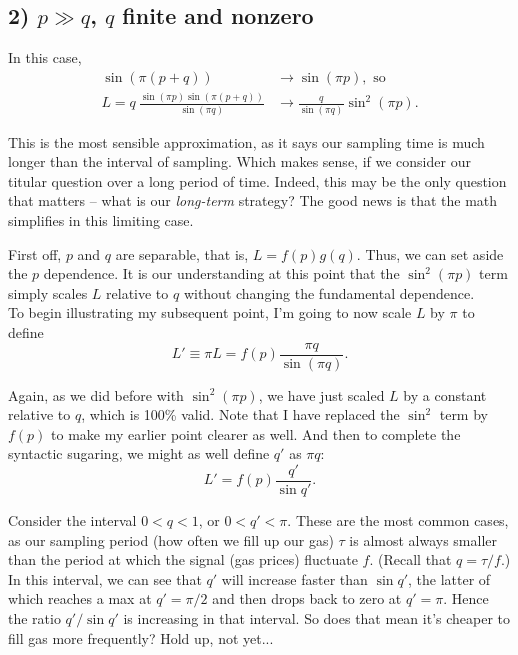 \documentclass[11pt]{article}
\begin{document}
\subsection*{2) $p \gg q$, $q$ finite and nonzero}

 In this case,
\begin{align}
\sin (\pi(p+q))  &\rightarrow \sin(\pi p), \text{ so} \nonumber\\[0.5em]
L = q \: \frac{\sin(\pi p) \sin(\pi (p+q))}{\sin(\pi q)} &\rightarrow \frac{q}{\sin(\pi q)}\sin^2(\pi p). \label{eq:p_to_infty}
\end{align}

This is the most sensible approximation, as it says our sampling time is much longer than the interval of sampling. Which makes sense, if we consider our titular question over a long period of time. Indeed, this may be the only question that matters -- what is our \textit{long-term} strategy? The good news is that the math simplifies in this limiting case. \\

\par
First off, $p$ and $q$ are separable, that is, $L = f(p)g(q)$. Thus, we can set aside the $p$ dependence. It is our understanding at this point that the $\sin^2(\pi p)$ term simply scales $L$ relative to $q$ without changing the fundamental dependence. \\

To begin illustrating my subsequent point, I'm going to now scale $L$ by $\pi$ to define
\begin{equation}
L' \equiv \pi L = f(p) \frac{\pi q}{\sin (\pi q)}.
\end{equation}

Again, as we did before with $\sin^2(\pi p)$, we have just scaled $L$ by a constant relative to $q$, which is 100\% valid. Note that I have replaced the $\sin^2$ term by $f(p)$ to make my earlier point clearer as well. And then to complete the syntactic sugaring, we might as well define $q'$ as $\pi q$:
\begin{equation}
L' = f(p) \frac{q'}{\sin q'}.
\end{equation}

Consider the interval $0 < q < 1$, or $0 < q' < \pi$. These are the most common cases, as our sampling period (how often we fill up our gas) $\tau$ is almost always smaller than the period at which the signal (gas prices) fluctuate $f$. (Recall that $q = \tau / f$.) In this interval, we can see that $q'$ will increase faster than $\sin q'$, the latter of which reaches a max at $q' =\pi/2$ and then drops back to zero at $q' = \pi$. Hence the ratio $q'/\sin q'$ is increasing in that interval. So does that mean it's cheaper to fill gas more frequently? Hold up, not yet...
\end{document}
